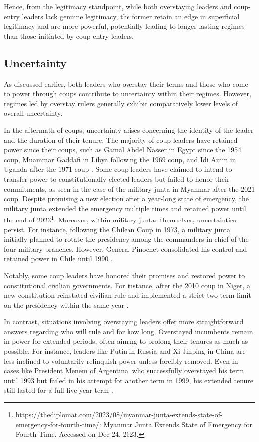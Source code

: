 \documentclass[
  12pt,
  a4paper,
  12pt]{article}
\begin{document}
Hence, from the legitimacy standpoint, while both overstaying leaders
and coup-entry leaders lack genuine legitimacy, the former retain an
edge in superficial legitimacy and are more powerful, potentially
leading to longer-lasting regimes than those initiated by coup-entry
leaders.

\subsection{Uncertainty}\label{uncertainty}

As discussed earlier, both leaders who overstay their terms and those
who come to power through coups contribute to uncertainty within their
regimes. However, regimes led by overstay rulers generally exhibit
comparatively lower levels of overall uncertainty.

In the aftermath of coups, uncertainty arises concerning the identity of
the leader and the duration of their tenure. The majority of coup
leaders have retained power since their coups, such as Gamal Abdel
Nasser in Egypt since the 1954 coup, Muammar Gaddafi in Libya following
the 1969 coup, and Idi Amin in Uganda after the 1971 coup
\citep{geddes2018}. Some coup leaders have claimed to intend to transfer
power to constitutionally elected leaders but failed to honor their
commitments, as seen in the case of the military junta in Myanmar after
the 2021 coup. Despite promising a new election after a year-long state
of emergency, the military junta extended the emergency multiple times
and retained power until the end of 2023\footnote{\url{https://thediplomat.com/2023/08/myanmar-junta-extends-state-of-emergency-for-fourth-time/}:
  Myanmar Junta Extends State of Emergency for Fourth Time. Accessed on
  Dec 24, 2023.}. Moreover, within military juntas themselves,
uncertainties persist. For instance, following the Chilean Coup in 1973,
a military junta initially planned to rotate the presidency among the
commanders-in-chief of the four military branches. However, General
Pinochet consolidated his control and retained power in Chile until 1990
\citep{svolik2014}.

Notably, some coup leaders have honored their promises and restored
power to constitutional civilian governments. For instance, after the
2010 coup in Niger, a new constitution reinstated civilian rule and
implemented a strict two-term limit on the presidency within the same
year \citep{ginsburg2019}.

In contrast, situations involving overstaying leaders offer more
straightforward answers regarding who will rule and for how long.
Overstayed incumbents remain in power for extended periods, often aiming
to prolong their tenures as much as possible. For instance, leaders like
Putin in Russia and Xi Jinping in China are less inclined to voluntarily
relinquish power unless forcibly removed. Even in cases like President
Menem of Argentina, who successfully overstayed his term until 1993 but
failed in his attempt for another term in 1999, his extended tenure
still lasted for a full five-year term \citep{llanos2019}.
\end{document}
